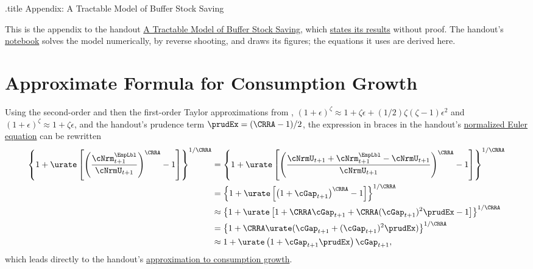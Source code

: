 \documentclass{econark}
\begin{document}
\handoutHeader

\begin{verbatimwrite}{\jobname.title}
Appendix: A Tractable Model of Buffer Stock Saving
\end{verbatimwrite}

\handoutNameMake

This is the appendix to the handout \href{\HandoutPDF}{A Tractable Model of Buffer Stock Saving}, which \hyperref[sec:TractableBufferStock-AppendixResults]{states its results} without proof.  The handout's \href{https://github.com/llorracc/TractableBufferStock/blob/main/TractableBufferStock.ipynb}{notebook} solves the model numerically, by reverse shooting, and draws its figures; the equations it uses are derived here.

\appendix

\section{Approximate Formula for Consumption Growth}\label{sec:CGroApprox}

Using the second-order and then the first-order Taylor approximations from \MathFactsList, \TaylorTwo $(1+\epsilon)^{\zeta} \approx 1 + \zeta \epsilon +
(1/2)\zeta(\zeta-1) \epsilon^{2}$ and \TaylorOne $(1+\epsilon)^{\zeta} \approx 1 + \zeta \epsilon$, and the handout's prudence term $\prudEx = (\CRRA-1)/2$, the expression in braces
in the handout's \hyperref[eq:BeforePFStep]{normalized Euler equation} can be rewritten
\begin{equation}\begin{gathered}\begin{aligned}
        \left\{1+\urate\left[\left(\frac{{\cNrm}^{\EmpLbl}_{t+1}}{\cNrmU_{t+1}}\right)^{\CRRA}-1\right]\right\}^{1/\CRRA} & =  \left\{1+\urate\left[\left(\frac{\cNrmU_{t+1}+{\cNrm}^{\EmpLbl}_{t+1}-\cNrmU_{t+1}}{\cNrmU_{t+1}}\right)^{\CRRA}-1\right]\right\}^{1/\CRRA}
\\      & =  \left\{1+\urate\left[\left(1+\cGap _{t+1}\right)^{\CRRA}-1\right]\right\}^{1/\CRRA}
\\      & \approx       \left\{1+\urate\left[1+\CRRA \cGap _{t+1}+ \CRRA (\cGap _{t+1})^{2}\prudEx-1\right]\right\}^{1/\CRRA}
\\ & =          \left\{1+ \CRRA \urate (\cGap _{t+1}+ (\cGap _{t+1})^{2}\prudEx)\right\}^{1/\CRRA}
\\ & \approx  1+ \urate  \left(1+\cGap _{t+1}\prudEx\right)\cGap _{t+1},
\end{aligned}\end{gathered}\end{equation}
which leads directly to the handout's \hyperref[eq:cedelapprox]{approximation to consumption growth}.
\end{document}
